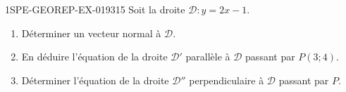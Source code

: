 \begin{exercice}{1SPE-GEOREP-EX-019}{3}{15}
Soit la droite $\mathcal{D} : y = 2x - 1$.
\begin{enumerate}
  \item Déterminer un vecteur normal à $\mathcal{D}$.
  \item En déduire l'équation de la droite $\mathcal{D}'$ parallèle à $\mathcal{D}$ passant par $P(3 ; 4)$.
  \item Déterminer l'équation de la droite $\mathcal{D}''$ perpendiculaire à $\mathcal{D}$ passant par $P$.
\end{enumerate}
\end{exercice}
